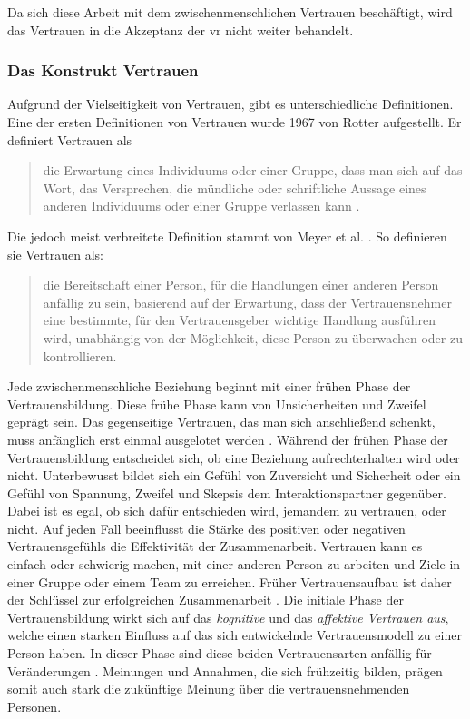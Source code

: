 \documentclass[a4paper,11pt]{article}%
\renewcommand{\\}{\vspace*{0.5\baselineskip} \newline}
\begin{document}
Da sich diese Arbeit mit dem zwischenmenschlichen Vertrauen beschäftigt, wird das Vertrauen in die Akzeptanz der \ac{vr} nicht weiter behandelt.
\subsubsection{Das Konstrukt Vertrauen}
\label{Konstrukt des Vertrauens}
Aufgrund der Vielseitigkeit von Vertrauen, gibt es unterschiedliche Definitionen. \newline
Eine der ersten Definitionen von Vertrauen wurde 1967 von Rotter aufgestellt. Er definiert Vertrauen als 
\begin{quote}
\glqq{}die Erwartung eines Individuums oder einer Gruppe, dass man sich auf das Wort, das Versprechen, die mündliche oder schriftliche Aussage eines anderen Individuums oder einer Gruppe verlassen kann\dq{} \citep[S. 651]{rotter1967new}.
\end{quote}
Die jedoch meist verbreitete Definition stammt von Meyer et al. \citep[S. 712]{mayer1995integrative}. So definieren sie Vertrauen als:
\begin{quote} \glqq{}die Bereitschaft einer Person, für die Handlungen einer anderen Person anfällig zu sein, basierend auf der Erwartung, dass der Vertrauensnehmer eine bestimmte, für den Vertrauensgeber wichtige Handlung ausführen wird, unabhängig von der Möglichkeit, diese Person zu überwachen oder zu kontrollieren.\dq{} \end{quote}
Jede zwischenmenschliche Beziehung beginnt mit einer frühen Phase der Vertrauensbildung. Diese frühe Phase kann von Unsicherheiten und Zweifel geprägt sein. Das gegenseitige Vertrauen, das man sich anschließend schenkt, muss anfänglich erst einmal ausgelotet werden \citep[S. 166-168]{meyerson1996swift}.
Während der frühen Phase der Vertrauensbildung entscheidet sich, ob eine Beziehung aufrechterhalten wird oder nicht. Unterbewusst bildet sich ein Gefühl von Zuversicht und Sicherheit oder ein Gefühl von Spannung, Zweifel und Skepsis dem Interaktionspartner gegenüber. 
Dabei ist es egal, ob sich dafür entschieden wird, jemandem zu vertrauen, oder nicht. Auf jeden Fall beeinflusst die Stärke des positiven oder negativen Vertrauensgefühls die Effektivität der Zusammenarbeit. Vertrauen kann es einfach oder schwierig machen, mit einer anderen Person zu arbeiten und Ziele in einer Gruppe oder einem Team zu erreichen.
Früher Vertrauensaufbau ist daher der Schlüssel zur erfolgreichen Zusammenarbeit \citep[S. 405-406]{bigley1998straining}.
Die initiale Phase der Vertrauensbildung wirkt sich auf das \textit{kognitive} und das \textit{affektive Vertrauen aus}, welche einen starken Einfluss auf das sich entwickelnde Vertrauensmodell zu einer Person haben. In dieser Phase sind diese beiden Vertrauensarten anfällig für Veränderungen \citep[S. 461-462]{baldwin1992relational}.
Meinungen und Annahmen, die sich frühzeitig bilden, prägen somit auch stark die zukünftige Meinung über die vertrauensnehmenden Personen.
\end{document}
